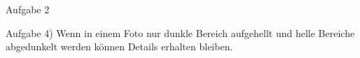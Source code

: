 \documentclass[SSS_Laborbericht.tex]{subfiles}
\begin{document}



\noindent\Large{Aufgabe 2}





\newpage
\noindent\Large{Aufgabe 4)}
\noindent\normalsize{Wenn in einem Foto nur dunkle Bereich aufgehellt und helle Bereiche abgedunkelt werden können Details erhalten bleiben.}
\end{document}
